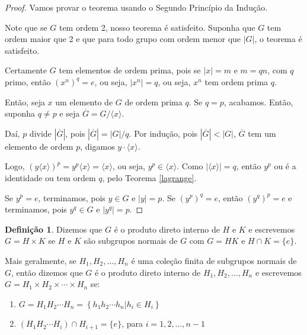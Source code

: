 \documentclass[a4paper,portuguese,11pt,twoside, leqno]{book}
\theoremstyle{definition}
\newtheorem{deff}{Definição}[section]
\begin{document}
	\begin{proof}
		Vamos provar o teorema usando o Segundo Princípio da Indução. 
		\par\vspace{0.3cm} Note que se $G$ tem ordem 2, nosso teorema é satisfeito. Suponha que $G$ tem ordem maior que 2 e que para todo grupo com ordem menor que $|G|$, o teorema é satisfeito. 
		\par\vspace{0.3cm} Certamente $G$ tem elementos de ordem prima, pois se $|x| = m$ e $m = qn$, com $q$ primo, então $(x^n)^q = e$, ou seja, $|x^n| = q$, ou seja, $x^n$ tem ordem prima $q$.
		\par\vspace{0.3cm} Então, seja $x$ um elemento de $G$ de ordem prima $q$. Se $q = p$, acabamos. Então, suponha $q\neq p$ e seja $\overline{G} = G/\langle x \rangle$.
		\par\vspace{0.3cm} Daí, $p$ divide $|\overline{G}|$, pois $|\overline{G}| = |G|/q$. Por indução, pois $|\overline{G}|<|G|$, $\overline{G}$ tem um elemento de ordem $p$, digamos $y\cdot\langle x \rangle$.
		\par\vspace{0.3cm} Logo, $(y\langle x \rangle)^p = y^p\langle x \rangle = \langle x\rangle$, ou seja, $y^p\in\langle x \rangle$. Como $|\langle x \rangle| = q$, então $y^p$ ou é a identidade ou tem ordem $q$, pelo Teorema \eqref{lagrange}.
		\par\vspace{0.3cm} Se $y^p = e$, terminamos, pois $y\in G$ e $|y|=p$. Se $(y^p)^q = e$, então $(y^q)^p = e$ e terminamos, pois $y^q\in G$ e $|y^q| = p$.
	\end{proof}
	
	
	\begin{deff}
		\label{def prod direto interno}
		Dizemos que $G$ é o produto direto interno de $H$ e $K$ e escrevemos $G = H\times K$ se $H$ e $K$ são subgrupos normais de $G$ com $G = HK$ e $H\cap K = \{e\}$.
		\par\vspace{0.3cm} Mais geralmente, se $H_1, H_2, \dots, H_n$ é uma coleção finita de subgrupos normais de $G$, então dizemos que $G$ é o produto direto interno de $H_1, H_2, \dots, H_n$ e escrevemos $G = H_1\times H_2\times\cdots\times H_n$ se: 
		\begin{enumerate}
			\item $G = H_1H_2\cdots H_n = \left\{ h_1h_2\cdots h_n | h_i\in H_i\right\}$
			\item $(H_1H_2\cdots H_i)\cap H_{i+1} = \{e\}$, para $i = 1, 2, \dots, n-1$
		\end{enumerate}
	\end{deff}
	
\end{document}
